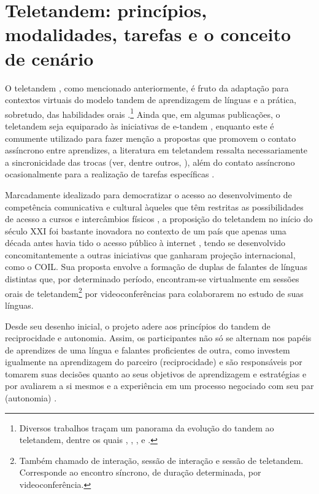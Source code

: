 \documentclass[portuguese]{textolivre}
\begin{document}
\section{Teletandem: princípios, modalidades, tarefas e o conceito de cenário}\label{secao2}
O teletandem \cite{telles2006a}, como mencionado anteriormente, é fruto da adaptação para contextos virtuais do modelo tandem de aprendizagem de línguas e a prática, sobretudo, das habilidades orais \cite{little1996, funk2017}.\footnote{Diversos trabalhos traçam um panorama da evolução do tandem ao teletandem, dentre os quais \textcite{aranha2021}, \textcite{garcia2015}, \textcite{garcia2022}, \textcite{dutra2024} e \textcite{ferro2024}.} Ainda que, em algumas publicações, o teletandem seja equiparado às iniciativas de e-tandem \cite{odowd2018, gonzalez-lloret2024}, enquanto este é comumente utilizado para fazer menção a propostas que promovem o contato assíncrono entre aprendizes, a literatura em teletandem ressalta necessariamente a sincronicidade das trocas (ver, dentre outros, \textcite{aranha2014, messias2020, souza2020}), além do contato assíncrono ocasionalmente para a realização de tarefas específicas \cite{cunha2024, rampazzo2024}.

Marcadamente idealizado para democratizar o acesso ao desenvolvimento de competência comunicativa e cultural àqueles que têm restritas as possibilidades de acesso a cursos e intercâmbios físicos \cite{telles2006a}, a proposição do teletandem no início do século XXI foi bastante inovadora no contexto de um país que apenas uma década antes havia tido o acesso público à internet \cite{paiva2008}, tendo se desenvolvido concomitantemente a outras iniciativas que ganharam projeção internacional, como o COIL. Sua proposta envolve a formação de duplas de falantes de línguas distintas que, por determinado período, encontram-se virtualmente em sessões orais de teletandem\footnote{Também chamado de interação, sessão de interação e sessão de teletandem. Corresponde ao encontro síncrono, de duração determinada, por videoconferência.} por videoconferências para colaborarem no estudo de suas línguas.

Desde seu desenho inicial, o projeto adere aos princípios do tandem de reciprocidade e autonomia. Assim, os participantes não só se alternam nos papéis de aprendizes de uma língua e falantes proficientes de outra, como investem igualmente na aprendizagem do parceiro (reciprocidade) e são responsáveis por tomarem suas decisões quanto ao seus objetivos de aprendizagem e estratégias e por avaliarem a si mesmos e a experiência em um processo negociado com seu par (autonomia) \cite{aranha2014, aranha2021, cappellini2020, garcia2017, moore2023, salomao2009, vassallo2006}.
\end{document}
